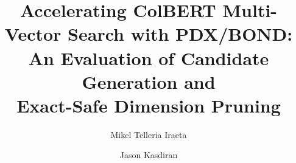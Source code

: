 \documentclass[11pt,a4paper]{article}
\title{%
  Accelerating ColBERT Multi-Vector Search with PDX/BOND:\\
  An Evaluation of Candidate Generation and \\
  Exact-Safe Dimension Pruning}
\author{Mikel Telleria Iraeta \and Jason Kasdiran}
\newcommand{\todometa}[1]{\textbf{[TODO: #1]}}
\begin{document}
	\maketitle



\hypersetup{pageanchor=true}
\renewenvironment{abstract}
 {\small
  \begin{center}
  \bfseries \abstractname\vspace{-.5em}\vspace{0pt}
  \end{center}
  \list{}{%
    \setlength{\leftmargin}{0.5mm}
    \setlength{\rightmargin}{\leftmargin}%
  }%
  \item\relax}
 {\endlist}
\end{document}
